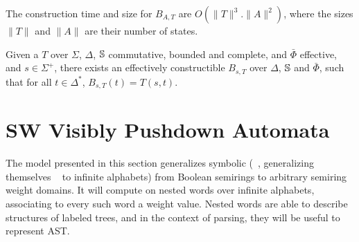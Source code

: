 \noindent
The construction time and size for $B_{A, T}$ are $O(\| T \|^3 . \| A \|^2)$,
where the sizes $\| T \|$ and $\| A \|$ are their number of states.


\begin{corollary} \label{cor:epsilon}
Given a \SWT $T$ over $\Sigma$, $\Delta$,
$\mathbb{S}$ commutative, bounded and complete,
and $\bar\Phi$ effective,
and $s \in \Sigma^+$,
there exists an effectively constructible \SWA
$B_{s, T}$ over $\Delta$, $\mathbb{S}$ and $\bar\Phi$,
such that for all $t \in \Delta^*$, $B_{s, T}(t) = T(s, t)$.
\end{corollary}











\section{SW Visibly Pushdown Automata}
\label{section:SWVPA}\label{sec:SWVPA}
The model presented in this section generalizes symbolic \VPA
(\SVPA~\cite{dAntonyAlur14SVPDA},
 generalizing themselves \VPA~\cite{AlurMadhusudan09nested} to infinite alphabets)
from Boolean semirings to arbitrary semiring weight domains.
It will compute on nested words over infinite alphabets,
associating to every such word a weight value.
Nested words are able to describe structures of labeled trees,
and in the context of parsing, they will be useful to
represent AST. %


